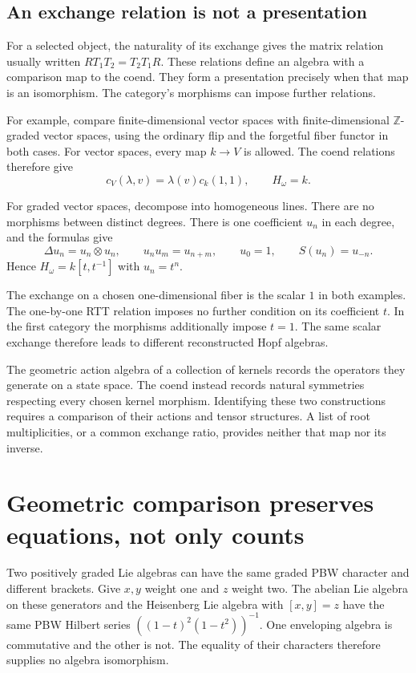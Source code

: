 \subsection{An exchange relation is not a presentation}

For a selected object, the naturality of its exchange gives the
matrix relation usually written
$RT_1T_2=T_2T_1R$.
These relations define an algebra with a comparison map to the coend.
They form a presentation precisely when that map is an isomorphism.
The category's morphisms can impose further relations.

For example, compare finite-dimensional vector spaces with
finite-dimensional $\mathbb Z$-graded vector spaces, using the
ordinary flip and the forgetful fiber functor in both cases.
For vector spaces, every map $k\to V$ is allowed.
The coend relations therefore give
\[
 c_V(\lambda,v)=\lambda(v)c_k(1,1),\qquad H_\omega=k.
\]

For graded vector spaces, decompose into homogeneous lines.
There are no morphisms between distinct degrees.
There is one coefficient $u_n$ in each degree, and the formulas give
\[
 \Delta u_n=u_n\otimes u_n,\qquad
 u_nu_m=u_{n+m},\qquad u_0=1,\qquad S(u_n)=u_{-n}.
\]
Hence $H_\omega=k[t,t^{-1}]$ with $u_n=t^n$.

The exchange on a chosen one-dimensional fiber is the scalar $1$
in both examples.
The one-by-one RTT relation imposes no further condition on its
coefficient $t$.
In the first category the morphisms additionally impose $t=1$.
The same scalar exchange therefore leads to different reconstructed
Hopf algebras.

The geometric action algebra of a collection of kernels records
the operators they generate on a state space.
The coend instead records natural symmetries respecting every
chosen kernel morphism.
Identifying these two constructions requires a comparison of their
actions and tensor structures.
A list of root multiplicities, or a common exchange ratio, provides
neither that map nor its inverse.

\section{Geometric comparison preserves equations, not only counts}

Two positively graded Lie algebras can have the same graded PBW
character and different brackets.
Give $x,y$ weight one and $z$ weight two.
The abelian Lie algebra on these generators and the Heisenberg
Lie algebra with $[x,y]=z$ have the same PBW Hilbert series
$((1-t)^2(1-t^2))^{-1}$.
One enveloping algebra is commutative and the other is not.
The equality of their characters therefore supplies no algebra
isomorphism.

